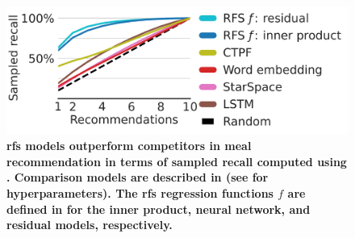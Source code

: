 \begin{figure}[t]
  \centering
  \includegraphics[width=0.7\linewidth]{ch-rfs/fig/meal-recall}
  \caption[\textsc{rfs} results on meal recommendation]{
  \textbf{\acrlong{rfs} models outperform competitors in meal
 recommendation in terms of sampled recall computed using . Comparison models are described in  (see  for hyperparameters). The \gls{rfs} regression functions $f$ are defined in  for the inner product, neural network, and residual models, respectively.}%
    }
  \label{fig:meal-recall}
\end{figure}